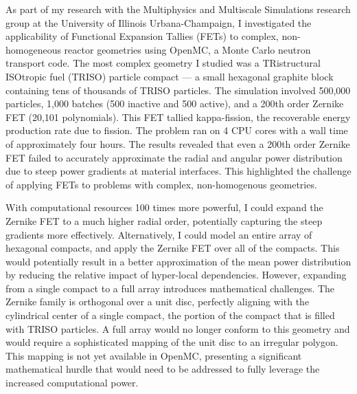 \documentclass[12pt]{letter}
\begin{document}
As part of my research with the Multiphysics and Multiscale Simulations research group at the University of Illinois Urbana-Champaign, I investigated the applicability of Functional Expansion Tallies (FETs) to complex, non-homogeneous reactor geometries using OpenMC, a Monte Carlo neutron transport code. The most complex geometry I studied was a TRistructural ISOtropic fuel (TRISO) particle compact --- a small hexagonal graphite block containing tens of thousands of TRISO particles. The simulation involved 500,000 particles, 1,000 batches (500 inactive and 500 active), and a 200th order Zernike FET (20,101 polynomials). This FET tallied kappa-fission, the recoverable energy production rate due to fission. The problem ran on 4 CPU cores with a wall time of approximately four hours. The results revealed that even a 200th order Zernike FET failed to accurately approximate the radial and angular power distribution due to steep power gradients at material interfaces. This highlighted the challenge of applying FETs to problems with complex, non-homogenous geometries.

With computational resources 100 times more powerful, I could expand the Zernike FET to a much higher radial order, potentially capturing the steep gradients more effectively. Alternatively, I could model an entire array of hexagonal compacts, and apply the Zernike FET over all of the compacts. This would potentially result in a better approximation of the mean power distribution by reducing the relative impact of hyper-local dependencies. However, expanding from a single compact to a full array introduces mathematical challenges. The Zernike family is orthogonal over a unit disc, perfectly aligning with the cylindrical center of a single compact, the portion of the compact that is filled with TRISO particles. A full array would no longer conform to this geometry and would require a sophisticated mapping of the unit disc to an irregular polygon. This mapping is not yet available in OpenMC, presenting a significant mathematical hurdle that would need to be addressed to fully leverage the increased computational power. 
\end{document}
